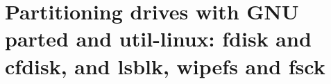 
\chapter{Partitioning drives with GNU parted and util-linux: fdisk and cfdisk, and lsblk, wipefs and fsck}

